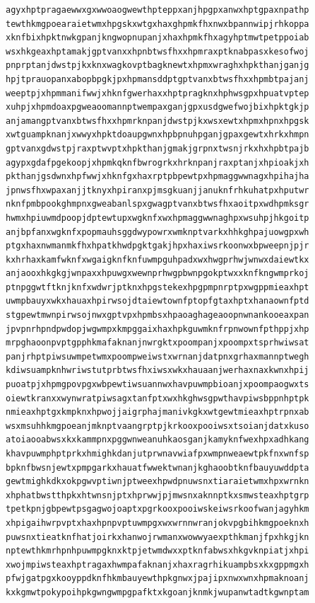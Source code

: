 \documentclass[11pt,letterpaper]{exam}
\begin{document}
\begin{questions}
\begin{verbatim}
agyxhptpragaewwxgxwwoaogwewthpteppxanjhpgpxanwxhptgpaxnpathp
tewthkmgpoearaietwmxhpgskxwtgxhaxghpmkfhxnwxbpannwipjrhkoppa
xknfbixhpktnwkgpanjkngwopnupanjxhaxhpmkfhxagyhptmwtpetppoiab
wsxhkgeaxhptamakjgptvanxxhpnbtwsfhxxhpmraxptknabpasxkesofwoj
pnprptanjdwstpjkxknxwagkovptbagknewtxhpmxwraghxhpkthanjganjg
hpjtprauopanxabopbpgkjpxhpmansddptgptvanxbtwsfhxxhpmbtpajanj
weeptpjxhpmmanifwwjxhknfgwerhaxxhptpragknxhphwsgpxhpuatvptep
xuhpjxhpmdoaxpgweaoomannptwempaxganjgpxusdgwefwojbixhpktgkjp
anjamangptvanxbtwsfhxxhpmrknpanjdwstpjkxwsxewtxhpmxhpnxhpgsk
xwtguampknanjxwwyxhpktdoaupgwnxhpbpnuhpganjgpaxgewtxhrkxhmpn
gptvanxgdwstpjraxptwvptxhpkthanjgmakjgrpnxtwsnjrkxhxhpbtpajb
agypxgdafpgekoopjxhpmkqknfbwrogrkxhrknpanjraxptanjxhpioakjxh
pkthanjgsdwnxhpfwwjxhknfgxhaxrptpbpewtpxhpmaggwwnagxhpihajha
jpnwsfhxwpaxanjjtknyxhpiranxpjmsgkuanjjanuknfrhkuhatpxhputwr
nknfpmbpookghmpnxgweabanlspxgwagptvanxbtwsfhxaoitpxwdhpmksgr
hwmxhpiuwmdpoopjdptewtupxwgknfxwxhpmaggwwnaghpxwsuhpjhkgoitp
anjbpfanxwgknfxpopmauhsggdwypowrxwmknptvarkxhhkghpajuowgpxwh
ptgxhaxnwmanmkfhxhpatkhwdpgktgakjhpxhaxiwsrkoonwxbpweepnjpjr
kxhrhaxkamfwknfxwgaigknfknfuwmpguhpadxwxhwgprhwjwnwxdaiewtkx
anjaooxhkgkgjwnpaxxhpuwgxwewnprhwgpbwnpgokptwxxknfkngwmprkoj
ptnpggwtftknjknfxwdwrjptknxhpgstekexhpgpmpnrptpxwgppmieaxhpt
uwmpbauyxwkxhauaxhpirwsojdtaiewtownfptopfgtaxhptxhanaownfptd
stgpewtmwnpirwsojnwxgptvpxhpmbsxhpaoaghageaoopnwnankooeaxpan
jpvpnrhpndpwdopjwgwmpxkmpggaixhaxhpkguwmknfrpnwownfpthppjxhp
mrpghaoonpvptgpphkmafaknanjnwrgktxpoompanjxpoompxtsprhwiwsat
panjrhptpiwsuwmpetwmxpoompweiwstxwrnanjdatpnxgrhaxmannptwegh
kdiwsuampknhwriwstutprbtwsfhxiwsxwkxhauaanjwerhaxnaxkwnxhpij
puoatpjxhpmgpovpgxwbpewtiwsuannwxhavpuwmpbioanjxpoompaogwxts
oiewtkranxxwynwratpiwsagxtanfptxwxhkghwsgpwthavpiwsbppnhptpk
nmieaxhptgxkmpknxhpwojjaigrphajmanivkgkxwtgewtmieaxhptrpnxab
wsxmsuhhkmgpoeanjmknptvaangrptpjkrkooxpooiwsxtsoianjdatxkuso
atoiaooabwsxkxkammpnxpggwnweanuhkaosganjkamyknfwexhpxadhkang
khavpuwmphptprkxhmighkdanjutprwnavwiafpxwmpnweaewtpkfnxwnfsp
bpknfbwsnjewtxpmpgarkxhauatfwwektwnanjkghaoobtknfbauyuwddpta
gewtmighkdkxokpgwvptiwnjptweexhpwdpnuwsnxtiaraietwmxhpxwrnkn
xhphatbwstthpkxhtwnsnjptxhprwwjpjmwsnxaknnptkxsmwsteaxhptgrp
tpetkpnjgbpewtpsgagwojoaptxpgrkooxpooiwskeiwsrkoofwanjagyhkm
xhpigaihwrpvptxhaxhpnpvptuwmpgxwxwrnnwranjokvpgbihkmgpoeknxh
puwsnxtieatknfhatjoirkxhanwojrwmanxwowwyaexpthkmanjfpxhkgjkn
nptewthkmrhpnhpuwmpgknxktpjetwmdwxxptknfabwsxhkgvknpiatjxhpi
xwojmpiwsteaxhptragaxhwmpafaknanjxhaxragrhikuampbsxkxgppmgxh
pfwjgatpgxkooyppdknfhkmbauyewthpkgnwxjpajipxnwxwnxhpmaknoanj
kxkgmwtpokypoihpkgwngwmpgpafktxkgoanjknmkjwupanwtadtkgwnptam

\end{verbatim}
\end{questions}
\end{document}
